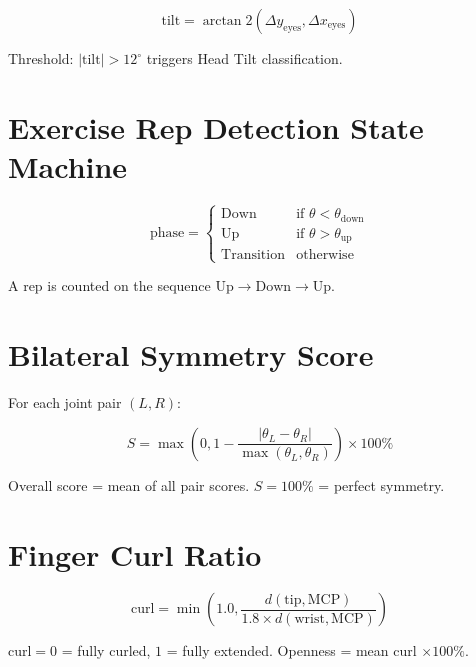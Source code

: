 \documentclass[a4paper,12pt]{report}
\begin{document}
\begin{equation}
    \text{tilt} = \arctan2(\Delta y_{\text{eyes}}, \Delta x_{\text{eyes}})
    \label{eq:tilt}
\end{equation}

Threshold: $|\text{tilt}| > 12^{\circ}$ triggers Head Tilt classification.

\section{Exercise Rep Detection State Machine}

\begin{equation}
    \text{phase} =
    \begin{cases}
        \text{Down} & \text{if } \theta < \theta_{\text{down}} \\
        \text{Up}   & \text{if } \theta > \theta_{\text{up}} \\
        \text{Transition} & \text{otherwise}
    \end{cases}
    \label{eq:exercise}
\end{equation}

A rep is counted on the sequence $\text{Up} \to \text{Down} \to \text{Up}$.

\section{Bilateral Symmetry Score}
For each joint pair $(L, R)$:

\begin{equation}
    S = \max\left(0, 1 - \frac{|\theta_L - \theta_R|}{\max(\theta_L, \theta_R)}\right) \times 100\%
    \label{eq:symmetry}
\end{equation}

Overall score = mean of all pair scores. $S = 100\%$ = perfect symmetry.

\section{Finger Curl Ratio}

\begin{equation}
    \text{curl} = \min\left(1.0, \frac{d(\text{tip}, \text{MCP})}{1.8 \times d(\text{wrist}, \text{MCP})}\right)
    \label{eq:curl}
\end{equation}

$\text{curl} = 0$ = fully curled, $1$ = fully extended. Openness = mean curl $\times 100\%$.
\end{document}
